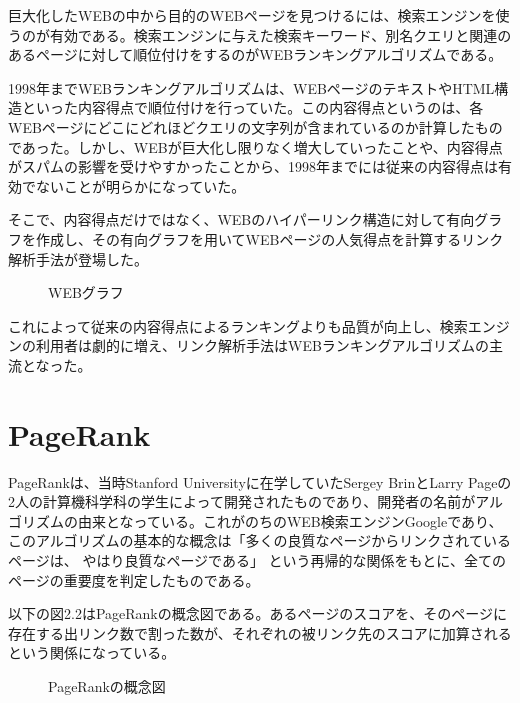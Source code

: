 \documentclass[a4paper,11pt]{jreport}
\begin{document}
巨大化したWEBの中から目的のWEBページを見つけるには、検索エンジンを使うのが有効である。検索エンジンに与えた検索キーワード、別名クエリと関連のあるページに対して順位付けをするのがWEBランキングアルゴリズムである。

1998年までWEBランキングアルゴリズムは、WEBページのテキストやHTML構造といった内容得点で順位付けを行っていた。この内容得点というのは、各WEBページにどこにどれほどクエリの文字列が含まれているのか計算したものであった。しかし、WEBが巨大化し限りなく増大していったことや、内容得点がスパムの影響を受けやすかったことから、1998年までには従来の内容得点は有効でないことが明らかになっていた。

そこで、内容得点だけではなく、WEBのハイパーリンク構造に対して有向グラフを作成し、その有向グラフを用いてWEBページの人気得点を計算するリンク解析手法が登場した。

\begin{figure}[htbp]
\begin{center}
\end{center}
\caption{WEBグラフ}
\label{figure:sample}
\end{figure}

これによって従来の内容得点によるランキングよりも品質が向上し、検索エンジンの利用者は劇的に増え、リンク解析手法はWEBランキングアルゴリズムの主流となった。


\section{PageRank}

PageRankは、当時Stanford Universityに在学していたSergey BrinとLarry Pageの2人の計算機科学科の学生によって開発されたものであり、開発者の名前がアルゴリズムの由来となっている。これがのちのWEB検索エンジンGoogleであり、このアルゴリズムの基本的な概念は「多くの良質なページからリンクされているページは、 やはり良質なページである」 という再帰的な関係をもとに、全てのページの重要度を判定したものである。

以下の図2.2はPageRankの概念図である。あるページのスコアを、そのページに存在する出リンク数で割った数が、それぞれの被リンク先のスコアに加算されるという関係になっている。

\begin{figure}[htbp]
\begin{center}
\end{center}
\caption{PageRankの概念図}
\label{figure:sample}
\end{figure}
\end{document}
